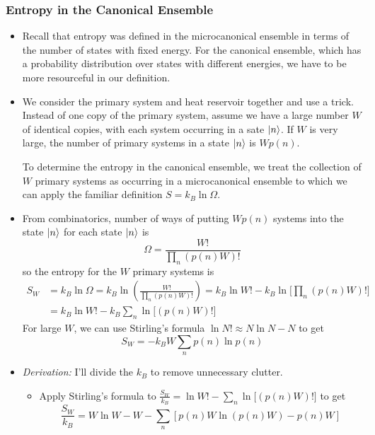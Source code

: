 \documentclass[11pt, a4paper]{article}
\begin{document}
\subsubsection{Entropy in the Canonical Ensemble}
\begin{itemize}
	\item Recall that entropy was defined in the microcanonical ensemble in terms of the number of states with fixed energy. For the canonical ensemble, which has a probability distribution over states with different energies, we have to be more resourceful in our definition. 
	
	\item We consider the primary system and heat reservoir together and use a trick. Instead of one copy of the primary system, assume we have a large number $ W $ of identical copies, with each system occurring in a sate $ \ket{n} $. If $ W $ is very large, the number of primary systems in a state $ \ket{n} $ is $ W p(n) $.
	
	To determine the entropy in the canonical ensemble, we treat the collection of $ W $ primary systems as occurring in a microcanonical ensemble to which we can apply the familiar definition $ S = k_{B} \ln \Omega$. 
	
	\item From combinatorics, number of ways of putting $ W p(n) $ systems into the state $ \ket{n} $ for each state $ \ket{n} $ is
	\begin{equation*}
		\Omega = \frac{W!}{\prod_{n}(p(n)W)!}
	\end{equation*}
	so the entropy for the $ W $ primary systems is
	\begin{align*}
		S_{W} &= k_{B} \ln \Omega = k_{B}\ln(\frac{W!}{\prod_{n}(p(n)W)!})=k_{B}\ln W! - k_{B}\ln  \big[\textstyle \prod_{n}(p(n)W)! \big]\\
		&=k_{B}\ln W! - k_{B} \sum_{n} \ln\big[(p(n)W)!\big]
	\end{align*}
	For large $ W $, we can use Stirling's formula $ \ln N! \approx N \ln N - N $ to get
	\begin{equation*}
		S_{W} = - k_{B} W \sum_{n}p(n)\ln p(n)
	\end{equation*}
	
	\item \textit{Derivation:} I'll divide the $ k_{B} $ to remove unnecessary clutter. 
	\begin{itemize}
		\item Apply Stirling's formula to $ \frac{S_{W}}{k_{B}} = \ln W! - \sum_{n} \ln\big[(p(n)W)!\big] $ to get
		\begin{equation*}
			\frac{S_{W}}{k_{B}} = W \ln W - W - \sum_{n}\left[p(n)W \ln (p(n)W) -p(n)W \right]
		\end{equation*}
	

\end{itemize}
\end{itemize}
\end{document}
